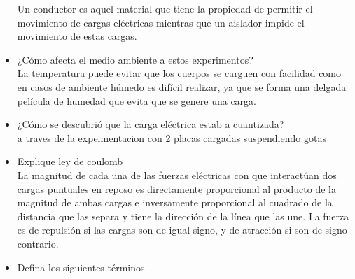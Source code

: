 \documentclass[11pt]{article}
\begin{document}
\begin{multicols}{2}
\begin{itemize}
Un conductor es aquel material que tiene la propiedad de permitir el movimiento
de cargas eléctricas mientras que un aislador impide el movimiento de estas
cargas.
	\item ¿Cómo afecta el medio ambiente a estos experimentos?\\
La temperatura puede evitar que los cuerpos se carguen con facilidad como en
casos de ambiente húmedo es difícil realizar, ya que se forma una delgada
película de humedad que evita que se genere una carga.
	\item ¿Cómo se descubrió que la carga eléctrica estab
a cuantizada?\\
a traves de la expeimentacion con 2 placas cargadas suspendiendo gotas
	\item Explique ley de coulomb\\
La magnitud de cada una de las fuerzas eléctricas con que interactúan dos cargas puntuales en reposo es directamente proporcional al producto de la magnitud de ambas cargas e inversamente proporcional al cuadrado de la distancia que las separa y tiene la dirección de la línea que las une. La fuerza es de repulsión si las cargas son de igual signo, y de atracción si son de signo contrario. 
	\item Defina los siguientes términos.
		\begin{itemize}


\end{itemize}
\end{itemize}
\end{multicols}
\end{document}
